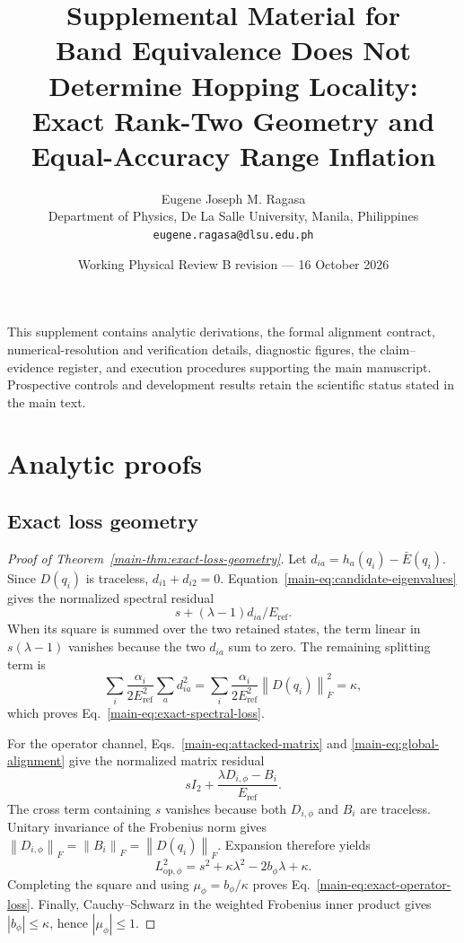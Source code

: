 \documentclass[11pt]{article}
\newcommand{\norm}[1]{\left\lVert #1\right\rVert}
\begin{document}
\title{Supplemental Material for\\
Band Equivalence Does Not Determine Hopping Locality:\\
Exact Rank-Two Geometry and Equal-Accuracy Range Inflation}
\author{Eugene Joseph M. Ragasa\\
Department of Physics, De La Salle University, Manila, Philippines\\
\texttt{eugene.ragasa@dlsu.edu.ph}}
\date{Working Physical Review B revision --- 16 October 2026}
\maketitle

\noindent This supplement contains analytic derivations, the formal alignment contract,
numerical-resolution and verification details, diagnostic figures, the claim--evidence
register, and execution procedures supporting the main manuscript. Prospective controls
and development results retain the scientific status stated in the main text.

\tableofcontents
\clearpage
\section{Analytic proofs}
\subsection{Exact loss geometry}
\begin{proof}[Proof of Theorem~\ref{main-thm:exact-loss-geometry}]
Let $d_{ia}=h_a(q_i)-\bar E(q_i)$. Since $D(q_i)$ is traceless,
$d_{i1}+d_{i2}=0$. Equation~\eqref{main-eq:candidate-eigenvalues} gives the normalized
spectral residual
\[
 s+(\lambda-1)d_{ia}/E_{\mathrm{ref}}.
\]
When its square is summed over the two retained states, the term linear in $s(\lambda-1)$
vanishes because the two $d_{ia}$ sum to zero. The remaining splitting term is
\[
 \sum_i\frac{\alpha_i}{2E_{\mathrm{ref}}^2}\sum_a d_{ia}^2
 =\sum_i\frac{\alpha_i}{2E_{\mathrm{ref}}^2}\norm{D(q_i)}_F^2
 =\kappa,
\]
which proves Eq.~\eqref{main-eq:exact-spectral-loss}.

For the operator channel, Eqs.~\eqref{main-eq:attacked-matrix} and
\eqref{main-eq:global-alignment} give the normalized matrix residual
\[
 sI_2+\frac{\lambda D_{i,\phi}-B_i}{E_{\mathrm{ref}}}.
\]
The cross term containing $s$ vanishes because both $D_{i,\phi}$ and $B_i$ are
traceless. Unitary invariance of the Frobenius norm gives
$\norm{D_{i,\phi}}_F=\norm{B_i}_F=\norm{D(q_i)}_F$. Expansion therefore yields
\[
 L_{\mathrm{op},\phi}^2
 =s^2+\kappa\lambda^2-2b_\phi\lambda+\kappa.
\]
Completing the square and using $\mu_\phi=b_\phi/\kappa$ proves
Eq.~\eqref{main-eq:exact-operator-loss}. Finally, Cauchy--Schwarz in the weighted Frobenius
inner product gives $|b_\phi|\le\kappa$, hence $|\mu_\phi|\le1$.
\end{proof}
\end{document}
